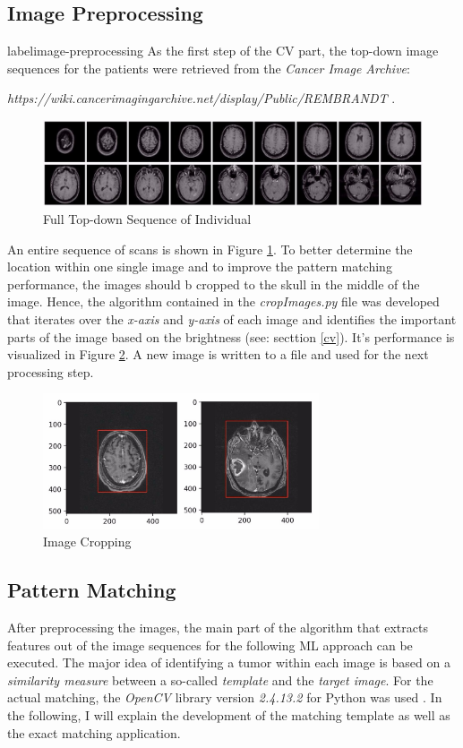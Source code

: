\documentclass[twoside,11pt]{article}
\begin{document}
\subsection{Image Preprocessing}
label{image-preprocessing}
As the first step of the CV part, the top-down image sequences for the patients were retrieved from the \textit{Cancer Image Archive}:

 \textit{https://wiki.cancerimagingarchive.net/display/Public/REMBRANDT} .
 
 
 \begin{figure}
 	\label{fig:full-sequence}
 	\centering
 	\includegraphics[width=15cm]{full-sequence}
 	\caption{Full Top-down Sequence of Individual}
 \end{figure}%
 
 
An entire sequence of scans is shown in Figure \ref{fig:full-sequence}.
To better determine the location within one single image and to improve the pattern matching performance, the images should b cropped to the skull in the middle of the image. Hence, the algorithm contained in the \textit{cropImages.py} file was developed that iterates over the \textit{x-axis} and \textit{y-axis} of each image and identifies the important parts of the image based on the brightness (see: secttion \ref{cv}). It's performance is visualized in Figure \ref{fig:crop-image}. A new image is written to a file and used for the next processing step.

\begin{figure}
	\label{fig:crop-image}
	\centering
	\includegraphics[height=4cm]{crop-image}
	\caption{Image Cropping}
\end{figure}%

\subsection{Pattern Matching}
After preprocessing the images, the main part of the algorithm that extracts features out of the image sequences for the following ML approach can be executed. The major idea of identifying a tumor within each image is based on a \textit{similarity measure} between a so-called \textit{template} and the \textit{target image}. For the actual matching, the \textit{OpenCV} library version \textit{2.4.13.2} for Python was used \citep{opencv}. 
In the following, I will explain the development of the matching template as well as the exact matching application.
\end{document}

